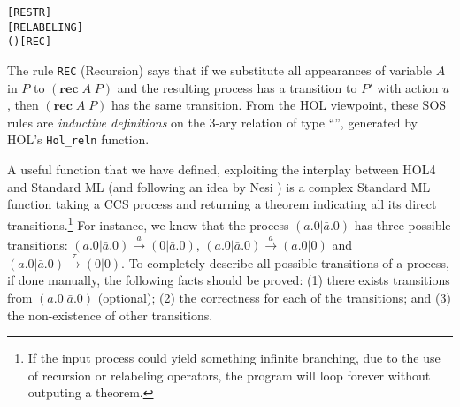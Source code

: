 \begin{alltt}
   \HOLSymConst{\ensuremath{\nu}}   \HOLTokenTransBegin{}\HOLTokenTransEnd \HOLSymConst{\ensuremath{\nu}}  \hfill\texttt{[RESTR]}
\HOLTokenTurnstile{}  \HOLTokenTransBegin{}\HOLTokenTransEnd {} \HOLSymConst{\HOLTokenImp{}}    \HOLTokenTransBegin{}  \HOLTokenTransEnd {}  \hfill\texttt{[RELABELING]}
\HOLTokenTurnstile{}   (  )  \HOLTokenTransBegin{}\HOLTokenTransEnd {} \HOLSymConst{\HOLTokenImp{}}    \HOLTokenTransBegin{}\HOLTokenTransEnd {}\hfill\texttt{[REC]}
\end{alltt}

The rule \texttt{REC} (Recursion)
 says that if we substitute all appearances of variable $A$ in $P$ to
$(\mathbf{rec}\; A\; P)$ and the resulting process has a transition to $P'$
with action $u$, then $(\mathbf{rec}\; A\; P)$ has the same
transition. From the HOL  viewpoint, these
SOS rules are \emph{inductive 
  definitions} on the 3-ary relation  of type ``'', generated by HOL's 
\texttt{Hol_reln} function.

A useful function that we have defined, exploiting the interplay
between HOL4 and Standard ML (and following an idea by Nesi \cite{Nesi:1992ve})
 is a complex Standard ML function
  taking a CCS process and returning a theorem indicating all its
  direct transitions.\footnote{If the input process could yield
    something infinite branching, due to the use of recursion or
    relabeling operators, the program will loop forever without
    outputing a theorem.}
For instance, we know that the process $(a.0 | \bar{a}.0)$ has three
possible transitions: $(a.0 | \bar{a}.0) \overset{a}{\longrightarrow}
(0 | \bar{a}.0)$, $(a.0 | \bar{a}.0)
\overset{\bar{a}}{\longrightarrow} (a.0 | 0)$ and $(a.0 | \bar{a}.0)
\overset{\tau}{\longrightarrow} (0 | 0)$.
To completely describe all possible transitions of a process, if done manually, the
following facts should be proved: (1) there exists transitions from
$(a.0 | \bar{a}.0)$ (optional); (2) the correctness for each of the
transitions; and (3) the non-existence of other transitions.

